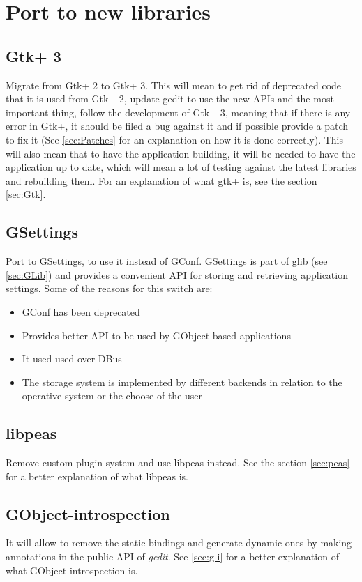 
\section{Port to new libraries}\label{sec:NewLibraries}

\subsection{Gtk+ 3}\label{sec:Gtk3}

Migrate from Gtk+ 2 to Gtk+ 3. This will mean to get rid of deprecated code that it is used from Gtk+ 2, update gedit to use the new APIs and the most important thing, follow the development of Gtk+ 3, meaning that if there is any error in Gtk+, it should be filed a bug against it and if possible provide a patch to fix it (See \ref{sec:Patches} for an explanation on how it is done correctly). This will also mean that to have the application building, it will be needed to have the application up to date, which will mean a lot of testing against the latest libraries and rebuilding them. For an explanation of what gtk+ is, see the section \ref{sec:Gtk}.

\subsection[GSettings]{GSettings\cite{website:gsettings}}\label{sec:GSettings}

Port to GSettings, to use it instead of GConf. GSettings is part of glib (see \ref{sec:GLib}) and provides a convenient API for storing and retrieving application settings. Some of the reasons for this switch are:
\begin{itemize}
  \item GConf has been deprecated
  \item Provides better API to be used by GObject-based applications
  \item It used used over DBus
  \item The storage system is implemented by different backends in relation to the operative system or the choose of the user
\end{itemize}

\subsection{libpeas}\label{sec:libpeas}

Remove custom plugin system and use libpeas instead. See the section \ref{sec:peas} for a better explanation of what libpeas is.

\subsection{GObject-introspection}\label{sec:GObjectIntrospection}

It will allow to remove the static bindings and generate dynamic ones by making annotations in the public API of \emph{gedit}. See \ref{sec:g-i} for a better explanation of what GObject-introspection is.
